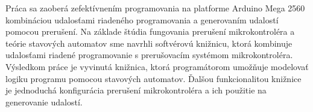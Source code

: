 
Práca sa zaoberá zefektívnením programovania na platforme Arduino Mega 2560 kombináciou udalosťami riadeného programovania a generovaním udalostí pomocou prerušení.
Na základe štúdia fungovania prerušení mikrokontroléra a teórie stavových automatov sme navrhli softvérovú knižnicu, ktorá kombinuje udalosťami riadené programovanie
s prerušovacím systémom mikrokontroléra.
Výsledkom práce je vyvinutá knižnica, ktorá programátorom umožňuje modelovať logiku programu pomocou stavových automatov. Ďalšou funkcionalitou knižnice je
jednoduchá konfigurácia prerušení mikrokontroléra a ich použitie na generovanie udalostí.
